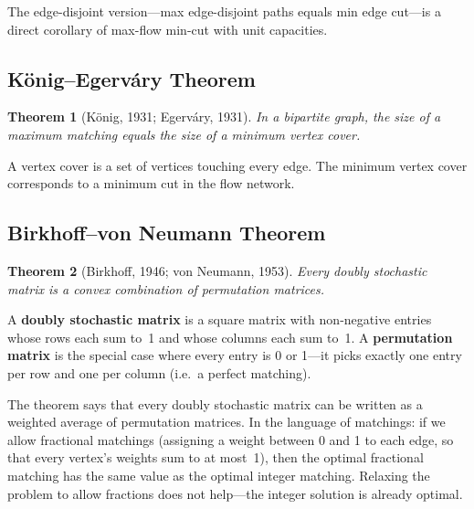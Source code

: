 \documentclass[11pt]{article}
\newtheorem{theorem}{Theorem}
\begin{document}
The edge-disjoint version---max edge-disjoint paths equals min
edge cut---is a direct corollary of max-flow min-cut with unit
capacities.

\subsection{K\"onig--Egerv\'ary Theorem}

\begin{theorem}[K\"onig, 1931; Egerv\'ary, 1931]
In a bipartite graph, the size of a maximum matching equals the
size of a minimum vertex cover.
\end{theorem}

A vertex cover is a set of vertices touching every edge.  The
minimum vertex cover corresponds to a minimum cut in the flow
network.

\subsection{Birkhoff--von Neumann Theorem}

\begin{theorem}[Birkhoff, 1946; von Neumann, 1953]
Every doubly stochastic matrix is a convex combination of
permutation matrices.
\end{theorem}

A \textbf{doubly stochastic matrix} is a square matrix with
non-negative entries whose rows each sum to~1 and whose columns
each sum to~1.  A \textbf{permutation matrix} is the special case
where every entry is 0 or 1---it picks exactly one entry per row
and one per column (i.e.\ a perfect matching).

The theorem says that every doubly stochastic matrix can be
written as a weighted average of permutation matrices.  In the
language of matchings: if we allow fractional matchings (assigning
a weight between 0 and 1 to each edge, so that every vertex's
weights sum to at most~1), then the optimal fractional matching
has the same value as the optimal integer matching.  Relaxing the
problem to allow fractions does not help---the integer solution
is already optimal.
\end{document}

